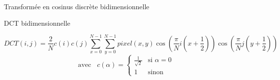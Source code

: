 \documentclass[xcolor=dvipsnames]{beamer}
\begin{document}
\begin{frame}{Transformée en cosinus discrète bidimensionnelle}        

    \centering
    DCT bidimensionnelle
    \scriptsize

    \[
        DCT(i,j) = \frac{2}{N} c(i) c(j) \sum_{x=0}^{N-1} \sum_{y=0}^{N-1} pixel(x,y) \cos \left( \frac{\pi}{N} i \left( x + \frac{1}{2} \right) \right) \cos \left( \frac{\pi}{N} j \left( y + \frac{1}{2} \right) \right)
    \]
    \[
        \text{avec} \ \ \ \ c(\alpha) =
        \begin{cases}
            \frac{1}{\sqrt{2}} & \text{si } \alpha = 0 \\
            1 & \text{sinon}
        \end{cases}
    \]
    
\end{frame}
\end{document}
